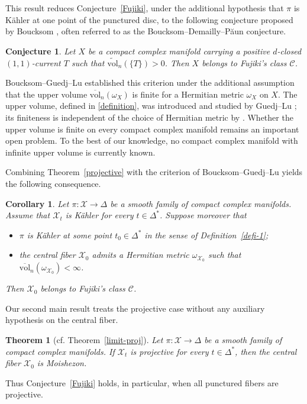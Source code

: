\documentclass[11pt,letterpaper]{amsart}
\numberwithin{equation}{section}
\newcommand{\cal}{\mathcal}
\def\cX{{\cal X}}
\DeclareMathOperator{\vol}{vol}
\newtheorem{theo}[prop]{Theorem}
\newtheorem{coro}[prop]{Corollary}
\newtheorem{conj}[prop]{Conjecture}
\def\vol{\text{vol}}
\begin{document}
This result reduces Conjecture~\ref{Fujiki}, under the additional hypothesis that $\pi$ is K\"ahler at one point of the punctured disc, to the following conjecture proposed by Boucksom \cite{Bou}, often referred to as the Boucksom--Demailly--P\u{a}un conjecture.
\begin{conj}\label{DP}
Let $X$ be a compact complex manifold carrying a positive $d$-closed $(1,1)$-current $T$ such that $\widetilde{\mathrm{vol}}_n(\{T\})>0$. Then $X$ belongs to Fujiki's class $\mathcal C$.
\end{conj}
Boucksom--Guedj--Lu \cite[Theorem C]{BGL} established this criterion under the additional assumption that the upper volume $\overline{\vol}_n(\omega_X)$ is finite for a Hermitian metric $\omega_X$ on $X$. The upper volume, defined in \eqref{definition}, was introduced and studied by Guedj--Lu \cite{GL}; its finiteness is independent of the choice of Hermitian metric by \cite[Theorem A]{GL}. Whether the upper volume is finite on every compact complex manifold remains an important open problem. To the best of our knowledge, no compact complex manifold with infinite upper volume is currently known.

Combining Theorem~\ref{projective} with the criterion of Boucksom--Guedj--Lu yields the following consequence.
\begin{coro}
Let $\pi:\cX\to\Delta$ be a smooth family of compact complex manifolds. Assume that $\cX_t$ is K\"ahler for every $t\in\Delta^*$. Suppose moreover that
\begin{itemize}
\item $\pi$ is K\"ahler at some point $t_0\in\Delta^*$ in the sense of Definition~\ref{defi-1};
\item the central fiber $\cX_0$ admits a Hermitian metric $\omega_{\cX_0}$ such that $\overline{\mathrm{vol}}_n(\omega_{\cX_0})<\infty$.
\end{itemize}
Then $\cX_0$ belongs to Fujiki's class $\mathcal C$.
\end{coro}

Our second main result treats the projective case without any auxiliary hypothesis on the central fiber.
\begin{theo}[cf. Theorem~\ref{limit-proj}]\label{project-1}
Let $\pi:\cX\to\Delta$ be a smooth family of compact complex manifolds. If $\cX_t$ is projective for every $t\in\Delta^*$, then the central fiber $\cX_0$ is Moishezon.
\end{theo}
Thus Conjecture~\ref{Fujiki} holds, in particular, when all punctured fibers are projective.
\end{document}
